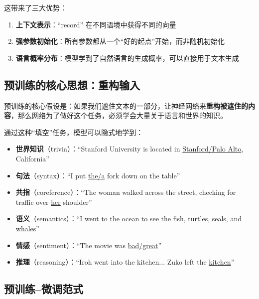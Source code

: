 \documentclass[a4paper]{article}
\begin{document}
这带来了三大优势：

\begin{enumerate}
    \item \textbf{上下文表示}：``record'' 在不同语境中获得不同的向量
    \item \textbf{强参数初始化}：所有参数都从一个``好的起点''开始，而非随机初始化
    \item \textbf{语言概率分布}：模型学到了自然语言的生成概率，可以直接用于文本生成
\end{enumerate}

\subsection{预训练的核心思想：重构输入}





预训练的核心假设是：如果我们遮住文本的一部分，让神经网络来\textbf{重构被遮住的内容}，那么网络为了做好这个任务，必须学会大量关于语言和世界的知识。

通过这种``填空''任务，模型可以隐式地学到：

\begin{itemize}
    \item \textbf{世界知识}（trivia）：``Stanford University is located in \underline{Stanford/Palo Alto}, California''
    \item \textbf{句法}（syntax）：``I put \underline{the/a} fork down on the table''
    \item \textbf{共指}（coreference）：``The woman walked across the street, checking for traffic over \underline{her} shoulder''
    \item \textbf{语义}（semantics）：``I went to the ocean to see the fish, turtles, seals, and \underline{whales}''
    \item \textbf{情感}（sentiment）：``The movie was \underline{bad/great}''
    \item \textbf{推理}（reasoning）：``Iroh went into the kitchen... Zuko left the \underline{kitchen}''
\end{itemize}





\subsection{预训练--微调范式}
\end{document}

